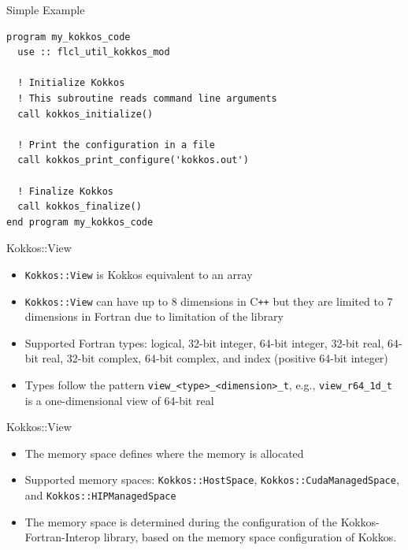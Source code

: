 \begin{frame}[containsverbatim]{Simple Example}
  \begin{verbatim}
program my_kokkos_code
  use :: flcl_util_kokkos_mod

  ! Initialize Kokkos
  ! This subroutine reads command line arguments
  call kokkos_initialize()

  ! Print the configuration in a file
  call kokkos_print_configure('kokkos.out')

  ! Finalize Kokkos
  call kokkos_finalize()
end program my_kokkos_code
  \end{verbatim}
\end{frame}

\begin{frame}{Kokkos::View}
  \begin{itemize}
    \item \texttt{Kokkos::View} is Kokkos equivalent to an array
    \item \texttt{Kokkos::View} can have up to 8 dimensions in C\texttt{++} but they are
      limited to 7 dimensions in Fortran due to limitation of the library
    \item Supported Fortran types: logical, 32-bit integer, 64-bit
      integer, 32-bit real, 64-bit real, 32-bit complex, 64-bit complex, and
      index (positive 64-bit integer)
    \item Types follow the pattern \texttt{view\_<type>\_<dimension>\_t}, e.g.,
      \texttt{view\_r64\_1d\_t} is a one-dimensional view of 64-bit real
  \end{itemize}
\end{frame}

\begin{frame}{Kokkos::View}
  \begin{itemize}
    \item The memory space defines where the memory is allocated
    \item Supported memory spaces: \texttt{Kokkos::HostSpace},
      \texttt{Kokkos::CudaManagedSpace}, and \texttt{Kokkos::HIPManagedSpace}
    \item The memory space is determined during the configuration of the
      Kokkos-Fortran-Interop library, based on the memory space
      configuration of Kokkos.
  \end{itemize}
\end{frame}

